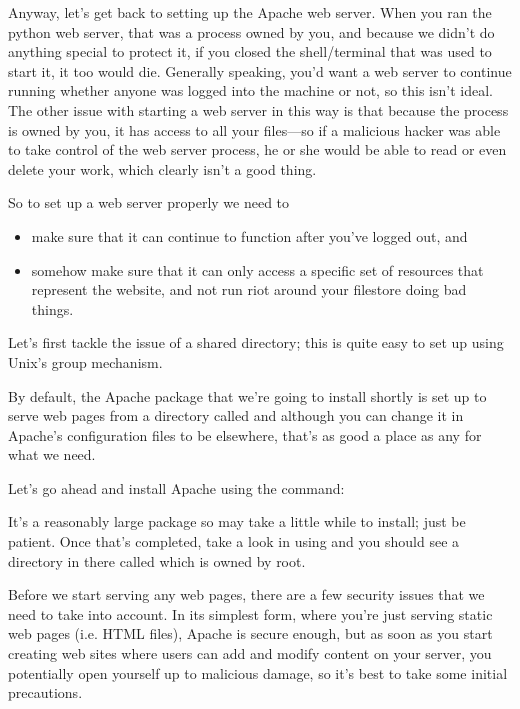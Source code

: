 Anyway, let's get back to setting up the Apache web server. When you ran the python web server, that was a process owned by you, and because we didn't do anything special to protect it, if you closed the shell/terminal that was used to start it, it too would die. Generally speaking, you'd want a web server to continue running whether anyone was logged into the machine or not, so this isn't ideal. The other issue with starting a web server in this way is that because the process is owned by you, it has access to all your files---so if a malicious hacker was able to take control of the web server process, he or she would be able to read or even delete your work, which clearly isn't a good thing. 

So to set up a web server properly we need to

\begin{itemize}
\item make sure that it can continue to function after you've logged out, and
\item somehow make sure that it can only access a specific set of resources that represent the website, and not run riot around your filestore doing bad things. 
\end{itemize}

Let's first tackle the issue of a shared directory; this is quite easy to set up using Unix's group mechanism. 

By default, the Apache package that we're going to install shortly is set up to serve web pages from a directory called  and although you can change it in Apache's configuration files to be elsewhere, that's as good a place as any for what we need. 

Let's go ahead and install Apache using the command:


It's a reasonably large package so may take a little while to install; just be patient. Once that's completed, take a look in  using  and you should see a directory in there called  which is owned by root.

Before we start serving any web pages, there are a few security issues that we need to take into account. In its simplest form, where you're just serving static web pages (i.e. HTML files), Apache is secure enough, but as soon as you start creating web sites where users can add and modify content on your server, you potentially open yourself up to malicious damage, so it's best to take some initial precautions. 

